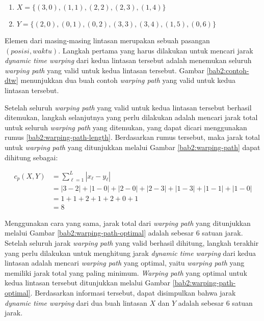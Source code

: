 \begin{enumerate}
    \item $X = \{ (3, 0), (1, 1), (2, 2), (2, 3), (1, 4) \}$
    \item $Y = \{ (2, 0), (0, 1), (0, 2), (3, 3), (3, 4), (1, 5), (0, 6) \}$
\end{enumerate}

Elemen dari masing-masing lintasan merupakan sebuah pasangan $(posisi, waktu)$. Langkah pertama yang harus dilakukan untuk mencari jarak \textit{dynamic time warping} dari kedua lintasan tersebut adalah menemukan seluruh \textit{warping path} yang valid untuk kedua lintasan tersebut. Gambar \ref{bab2:contoh-dtw} menunjukkan dua buah contoh \textit{warping path} yang valid untuk kedua lintasan tersebut.

Setelah seluruh \textit{warping path} yang valid untuk kedua lintasan tersebut berhasil ditemukan, langkah selanjutnya yang perlu dilakukan adalah mencari jarak total untuk seluruh \textit{warping path} yang ditemukan, yang dapat dicari menggunakan rumus \ref{bab2:warping-path-length}. Berdasarkan rumus tersebut, maka jarak total untuk \textit{warping path} yang ditunjukkan melalui Gambar \ref{bab2:warping-path} dapat dihitung sebagai:

\begin{align*}
    c_p(X, Y) & = \sum_{\ell = 1}^{L} |x_\ell - y_\ell| \\
    & = |3 - 2| + |1 - 0| + |2 - 0| + |2 - 3| + |1 - 3| + |1 - 1| + |1 - 0| \\
    & = 1 + 1 + 2 + 1 + 2 + 0 + 1 \\
    & = 8
\end{align*}

Menggunakan cara yang sama, jarak total dari \textit{warping path} yang ditunjukkan melalui Gambar \ref{bab2:warping-path-optimal} adalah sebesar $6$ satuan jarak. Setelah seluruh jarak \textit{warping path} yang valid berhasil dihitung, langkah terakhir yang perlu dilakukan untuk menghitung jarak \textit{dynamic time warping} dari kedua lintasan adalah mencari \textit{warping path} yang optimal, yaitu \textit{warping path} yang memiliki jarak total yang paling minimum. \textit{Warping path} yang optimal untuk kedua lintasan tersebut ditunjukkan melalui Gambar \ref{bab2:warping-path-optimal}. Berdasarkan informasi tersebut, dapat disimpulkan bahwa jarak \textit{dynamic time warping} dari dua buah lintasan $X$ dan $Y$ adalah sebesar $6$ satuan jarak.


